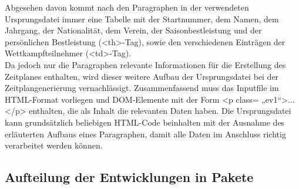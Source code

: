 Abgesehen davon kommt nach den Paragraphen in der verwendeten Ursprungsdatei immer eine Tabelle mit der Startnummer, dem Namen, dem Jahrgang, der Nationalität, dem Verein, der Saisonbestleistung und der persönlichen Bestleistung (<th>-Tag), sowie den verschiedenen Einträgen der Wettkampfteilnehmer (<td>-Tag). \\
Da jedoch nur die Paragraphen relevante Informationen für die Erstellung des Zeitplanes enthalten, wird dieser weitere Aufbau der Ursprungsdatei bei der Zeitplangenerierung vernachlässigt. 
Zusammenfassend muss das Inputfile im HTML-Format vorliegen und DOM-Elemente mit der Form <p class= „ev1“>...</p> enthalten, die als Inhalt die relevanten Daten haben. Die Ursprungsdatei kann grundsätzlich beliebigen HTML-Code beinhalten mit der Ausnahme des erläuterten Aufbaus eines Paragraphen, damit alle Daten im Anschluss richtig verarbeitet werden können.  

\subsection{Aufteilung der Entwicklungen in Pakete}

